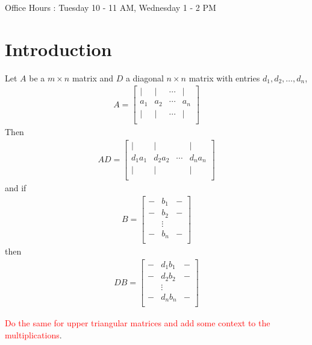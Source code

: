 

Office Hours : Tuesday 10 - 11 AM, Wednesday 1 - 2 PM

\section{Introduction}

Let $A$ be a $m \times n$ matrix and $D$ a diagonal $n \times n$
matrix with entries $d_1 , d_2 , \ldots , d_n$,
\begin{align*}
  A =
  \begin{bmatrix}%
    | & | & \cdots &  | \\
    a_1 & a_2 & \cdots &  a_n \\
    | & | & \cdots &  | \\
  \end{bmatrix}
\end{align*}
Then
\begin{align*}
  AD =
  \begin{bmatrix}%
    | & | & &  | \\
    d_1a_1 & d_2a_2 & \cdots &  d_na_n \\
    | & | & &  | \\
  \end{bmatrix}
\end{align*}
and if
\begin{align*}
  B =
  \begin{bmatrix}%
    - & b_1 & - \\
    - & b_2 & - \\
    & \vdots &  \\
    - & b_n & - \\
  \end{bmatrix}
\end{align*}
then
\begin{align*}
  DB =
  \begin{bmatrix}%
    - & d_1b_1 & - \\
    - & d_2b_2 & - \\
    & \vdots &  \\
    - & d_nb_n & - \\
  \end{bmatrix}
\end{align*}

\textcolor{red}{Do the same for upper triangular matrices and add
some context to the multiplications}.

